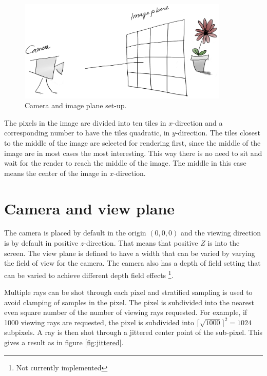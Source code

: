 \documentclass[a4paper]{report}
\begin{document}
\begin{figure}
  \centering
  \includegraphics[width=10cm]{figures/2}
  \caption{Camera and image plane set-up.}
  \label{fig:camera}
\end{figure}

The pixels in the image are divided into ten tiles in \(x\)-direction and
a corresponding number to have the tiles quadratic, in
\(y\)-direction. The tiles closest to the middle of the image are
selected for rendering first, since the middle of the image are in
most cases the most interesting. This way there is no need to sit and
wait for the render to reach the middle of the image. The middle in
this case means the center of the image in \(x\)-direction.

\section{Camera and view plane}
\label{sec:cam}

The camera is placed by default in the origin \((0, 0, 0)\) and the
viewing direction is by default in positive \(z\)-direction. That
means that positive \(Z\) is into the screen. The view plane is
defined to have a width that can be varied by varying the field of
view for the camera. The camera also has a depth of field setting that
can be varied to achieve different depth field effects \footnote{Not
  currently implemented}.

Multiple rays can be shot through each pixel and stratified sampling
is used to avoid clamping of samples in the pixel. The pixel is
subdivided into the nearest even square number of the number of
viewing rays requested. For example, if 1000 viewing rays are
requested, the pixel is subdivided into \(\lceil \sqrt{1000}
\rceil^2 = 1024 \) subpixels. A ray is then shot through a jittered
center point of the sub-pixel. This gives a result as in figure \ref{fig:jittered}.
\end{document}
